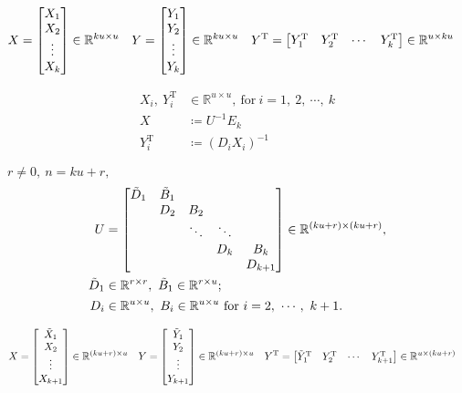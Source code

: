 \documentclass[11pt]{article}
\newcommand{\T}{\mathrm{T}}
\begin{document}
\begin{align*}
    X &= \mqty[
        X_{1} \\
        X_{2} \\
        \vdots \\
        X_{k}
        ]
    \in \mathbb{R}^{ku \times u}
    &
    Y &= \mqty[
        Y_{1} \\
        Y_{2} \\
        \vdots \\
        Y_{k}
        ]
    \in \mathbb{R}^{ku \times u}
    &
    Y^{\T} &= \mqty[
        Y_{1}^{\T} & Y_{2}^{\T} & \cdots & Y_{k}^{\T}
        ] \in \mathbb{R}^{u \times ku}
\end{align*}


\begin{align*}
    X_{i},\ Y_{i}^{\T} &\in \mathbb{R}^{u \times u},\ \text{for} \ i = 1,\ 2,\ \cdots,\ k \\
    X &\coloneqq U^{-1} E_{k} \\
    Y_{i}^{\T} &\coloneqq (D_{i} X_{i})^{-1}
\end{align*}



$r \neq 0,\ n = ku+r, $
\begin{align*}
    U &= \mqty[
        \tilde{D}_{1} & \tilde{B}_{1} &   &   &  \\
          & D_{2} & B_{2} &   &  \\
          &   & \ddots & \ddots &  \\
          &   &   & D_{k} & B_{k}\\
          &   &   &   & D_{k+1}
    ] \in \mathbb{R}^{(ku + r) \times (ku + r)},\\
    \tilde{D}_{1} &\in \mathbb{R}^{r \times r}, \ \tilde{B}_{1} \in \mathbb{R}^{r \times u};\\
    D_{i} &\in \mathbb{R}^{u \times u}, \ B_{i} \in \mathbb{R}^{u \times u} \ \text{for} \ i =  2,\ \cdots,\ k+1.
\end{align*}


\begin{align*}
    X &= \mqty[
        \tilde{X}_{1} \\
        X_{2} \\
        \vdots \\
        X_{k+1}
        ]
    \in \mathbb{R}^{(ku + r) \times u}
    &
    Y &= \mqty[
        \tilde{Y}_{1} \\
        Y_{2} \\
        \vdots \\
        Y_{k+1}
        ]
    \in \mathbb{R}^{(ku + r) \times u}
    &
    Y^{\T} &= \mqty[
        \tilde{Y}_{1}^{\T} & Y_{2}^{\T} & \cdots & Y_{k+1}^{\T}
        ] \in \mathbb{R}^{u \times (ku + r)}
\end{align*}
\end{document}
